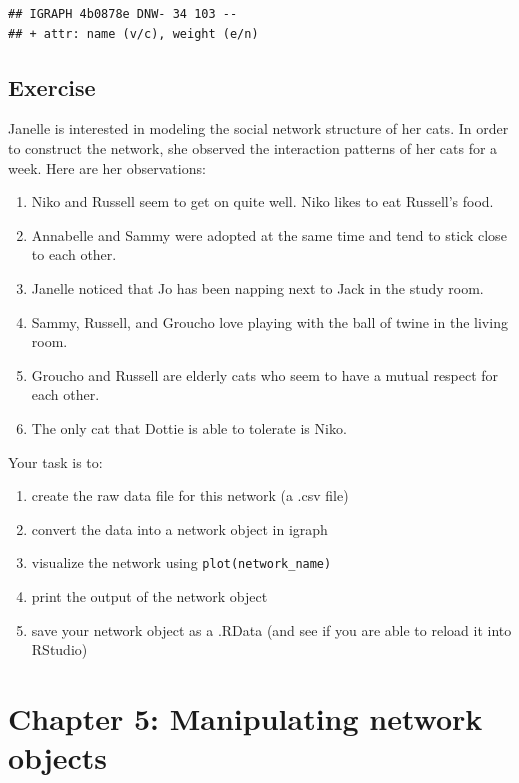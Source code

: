 \documentclass[
]{book}
\providecommand{\tightlist}{%
  \setlength{\itemsep}{0pt}\setlength{\parskip}{0pt}}
\begin{document}
\begin{verbatim}
## IGRAPH 4b0878e DNW- 34 103 -- 
## + attr: name (v/c), weight (e/n)
\end{verbatim}

\section{Exercise}\label{exercise-3}

Janelle is interested in modeling the social network structure of her cats. In order to construct the network, she observed the interaction patterns of her cats for a week. Here are her observations:

\begin{enumerate}
\def\labelenumi{\arabic{enumi}.}
\tightlist
\item
  Niko and Russell seem to get on quite well. Niko likes to eat Russell's food.
\item
  Annabelle and Sammy were adopted at the same time and tend to stick close to each other.
\item
  Janelle noticed that Jo has been napping next to Jack in the study room.
\item
  Sammy, Russell, and Groucho love playing with the ball of twine in the living room.
\item
  Groucho and Russell are elderly cats who seem to have a mutual respect for each other.
\item
  The only cat that Dottie is able to tolerate is Niko.
\end{enumerate}

Your task is to:

\begin{enumerate}
\def\labelenumi{(\roman{enumi})}
\tightlist
\item
  create the raw data file for this network (a .csv file)
\item
  convert the data into a network object in igraph
\item
  visualize the network using \texttt{plot(network\_name)}
\item
  print the output of the network object
\item
  save your network object as a .RData (and see if you are able to reload it into RStudio)
\end{enumerate}

\chapter{Chapter 5: Manipulating network objects}\label{ch5}
\end{document}
